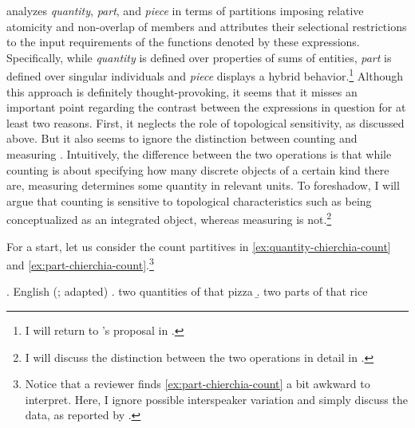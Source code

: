 \citeauthor{chierchia2010mass} analyzes \textit{quantity}, \textit{part}, and \textit{piece} in terms of partitions imposing relative atomicity and non-overlap of members and attributes their selectional restrictions to the input requirements of the functions denoted by these expressions. Specifically, while \textit{quantity} is defined over properties of sums of entities, \textit{part} is defined over singular individuals and \textit{piece} displays a hybrid behavior.\footnote{I will return to \citeauthor{chierchia2010mass}'s proposal in .} Although this approach is definitely thought-provoking, it seems that it misses an important point regarding the contrast between the expressions in question for at least two reasons. First, it neglects the role of topological sensitivity, as discussed above. But it also seems to ignore the distinction between counting and measuring \citep[see, e.g.,][]{rothstein2009individuating,rothstein2010counting,rothstein2011counting,rothstein2017semantics,partee_borschev2012sortal,khrizman_et-al2015portion,landman2016iceberg}. Intuitively, the difference between the two operations is that while counting is about specifying how many discrete objects of a certain kind there are, measuring determines some quantity in relevant units. To foreshadow, I will argue that counting is sensitive to topological characteristics such as being conceptualized as an integrated object, whereas measuring is not.\footnote{I will discuss the distinction between the two operations in detail in .} 

For a start, let us consider the count partitives in \ref{ex:quantity-chierchia-count} and \ref{ex:part-chierchia-count}.\footnote{Notice that a reviewer finds \ref{ex:part-chierchia-count} a bit awkward to interpret. Here, I ignore possible interspeaker variation and simply discuss the data, as reported by \citeauthor{chierchia2010mass}.} 

    \ex. English (\citealt{chierchia2010mass}; adapted)\label{ex:quantity-part-chierchia}
	\a. two quantities of that pizza\label{ex:quantity-chierchia-count}
	\b. two parts of that rice\label{ex:part-chierchia-count}

